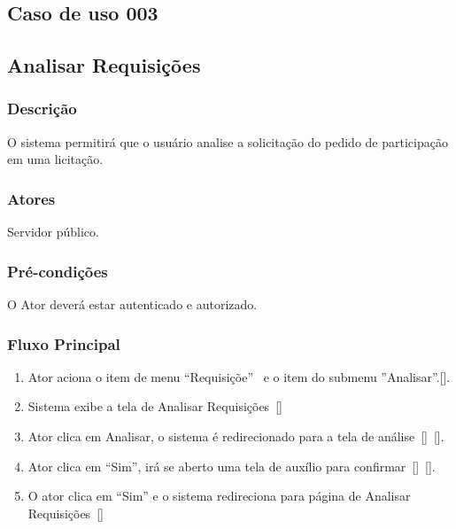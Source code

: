 \begin{anexosenv}
\chapter{Caso de uso 003}\label{CASO003}

\section*{Analisar Requisições}

\subsection*{Descrição}
O sistema permitirá que o usuário analise a solicitação do pedido de participação em uma licitação.

\subsection*{Atores}
Servidor público.

\subsection*{Pré-condições}
O Ator deverá estar autenticado e autorizado.

\subsection*{Fluxo Principal}
\begin{enumerate}
    \item Ator aciona o item de menu ``Requisiçõe''~ e o item do submenu ''Analisar''.[].
    \item\label{FP003002} Sistema exibe a tela de Analisar  Requisições~[]
    \item\label{FP003003} Ator clica em Analisar, o sistema é redirecionado para a tela de análise~[]~[].
    \item\label{FP003004} Ator clica em ``Sim'', irá se aberto uma tela de auxílio para confirmar~[]~[].
    \item\label{FP003005} O ator clica em ``Sim'' e o sistema redireciona para página de Analisar  Requisições~[]
\end{enumerate}


\end{anexosenv}

